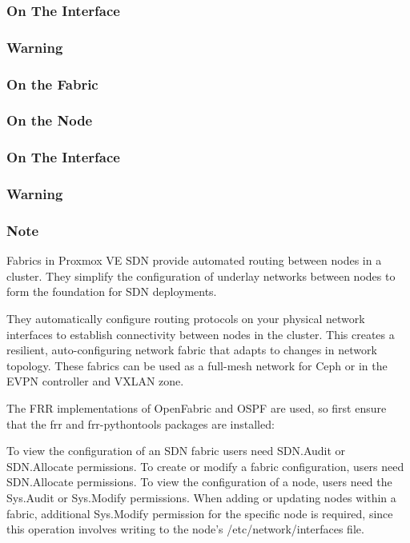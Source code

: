 \subsubsection{On The Interface}

\subsubsection{Warning}

\subsubsection{On the Fabric}

\subsubsection{On the Node}

\subsubsection{On The Interface}

\subsubsection{Warning}

\subsubsection{Note}

Fabrics in Proxmox VE SDN provide automated routing between nodes in a cluster. They simplify the configuration of underlay networks between nodes to form the foundation for SDN deployments.

They automatically configure routing protocols on your physical network interfaces to establish connectivity between nodes in the cluster. This creates a resilient, auto-configuring network fabric that adapts to changes in network topology. These fabrics can be used as a full-mesh network for Ceph or in the EVPN controller and VXLAN zone.

The FRR implementations of OpenFabric and OSPF are used, so first ensure that the frr and frr-pythontools packages are installed:

To view the configuration of an SDN fabric users need SDN.Audit or SDN.Allocate permissions. To create or modify a fabric configuration, users need SDN.Allocate permissions. To view the configuration of a node, users need the Sys.Audit or Sys.Modify permissions. When adding or updating nodes within a fabric, additional Sys.Modify permission for the specific node is required, since this operation involves writing to the node’s /etc/network/interfaces file.

